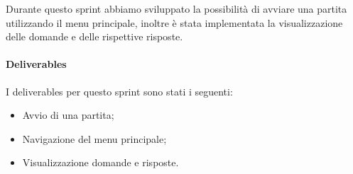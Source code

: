 Durante questo sprint abbiamo sviluppato la possibilità di avviare una partita utilizzando il menu principale, inoltre è stata implementata la visualizzazione delle domande e delle rispettive risposte.
\paragraph{Deliverables} 
I deliverables per questo sprint sono stati i seguenti:
\begin{itemize}
    \item Avvio di una partita;
    \item Navigazione del menu principale;
    \item Visualizzazione domande e risposte.
\end{itemize}
